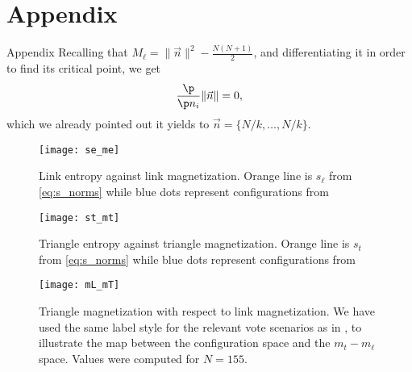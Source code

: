 \appendix
\section{Appendix}

\begin{frame}[allowframebreaks]{Appendix}
Recalling that $M_\ell = \|\vec{n}\|^2  - \frac{N(N+1)}{2}$, and differentiating it in order to find its critical point, we get 
$$\frac{\p}{\p n_i} \|\vec{n}\| =0,$$
which we already pointed out it yields to $\vec{n} = \{N / k, \ldots, N / k \}$.

\framebreak

 \begin{figure}
     \centering
	 \texttt{[image: se\_me]}
     \caption{Link entropy against link magnetization. Orange line is $s_\ell$ from \cref{eq:s_norms} while blue dots represent configurations from }
     \label{fig:sL_mL}
 \end{figure}
 \begin{figure}[!h]
     \centering
	 \texttt{[image: st\_mt]}
     \caption{Triangle entropy against triangle magnetization. Orange line is $s_t$ from \cref{eq:s_norms} while blue dots represent configurations from }
     \label{fig:sT_mT}
 \end{figure}

\framebreak

\begin{figure}
    \centering
    \texttt{[image: mL\_mT]}
    \caption{Triangle magnetization with respect to link magnetization. We have used the same label style for the relevant vote scenarios as in , to illustrate the map between the configuration space and the $m_t-m_\ell$ space. Values were computed for $N=155$.\label{fig:mL_mT}} 
\end{figure}    


\end{frame}
